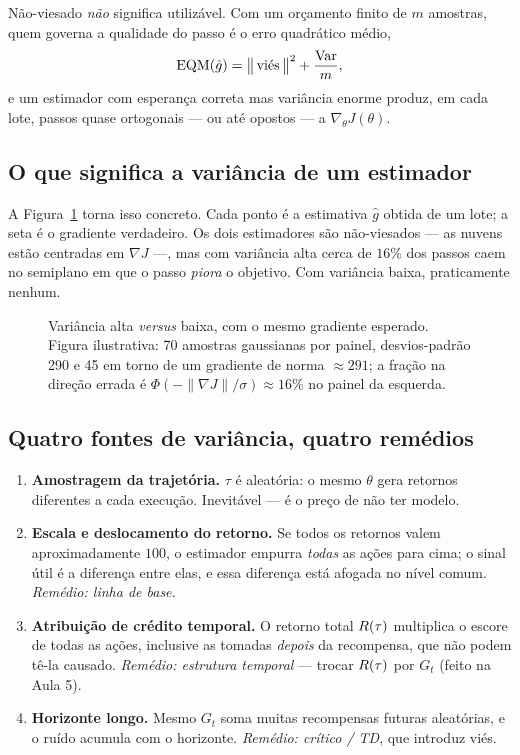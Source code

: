\documentclass[11pt, a4paper]{article}
\newcommand{\ghat}{\hat{g}}
\begin{document}
\begin{alertabox}
Não-viesado \emph{não} significa utilizável. Com um orçamento finito de $m$
amostras, quem governa a qualidade do passo é o erro quadrático médio,
\[
  \mathrm{EQM}(\ghat) = \big\|\,\text{viés}\,\big\|^2 + \frac{\Var}{m},
\]
e um estimador com esperança correta mas variância enorme produz, em cada lote,
passos quase ortogonais --- ou até opostos --- a $\nabla_\theta J(\theta)$.
\end{alertabox}

\subsection{O que significa a variância de um estimador}

A Figura~\ref{fig:variancia} torna isso concreto. Cada ponto é a estimativa
$\ghat$ obtida de um lote; a seta é o gradiente verdadeiro. Os dois
estimadores são não-viesados --- as nuvens estão centradas em $\nabla J$ ---,
mas com variância alta cerca de $16\%$ dos passos caem no semiplano em que o
passo \emph{piora} o objetivo. Com variância baixa, praticamente nenhum.

\begin{figure}[h]
  \centering
  \resizebox{\textwidth}{!}{}
  \caption{Variância alta \emph{versus} baixa, com o mesmo gradiente esperado.
  Figura ilustrativa: 70 amostras gaussianas por painel, desvios-padrão 290 e
  45 em torno de um gradiente de norma $\approx 291$; a fração na direção errada
  é $\Phi(-\|\nabla J\|/\sigma)\approx 16\%$ no painel da esquerda.}
  \label{fig:variancia}
\end{figure}

\subsection{Quatro fontes de variância, quatro remédios}

\begin{enumerate}
  \item \textbf{Amostragem da trajetória.} $\tau$ é aleatória: o mesmo $\theta$
        gera retornos diferentes a cada execução. Inevitável --- é o preço de
        não ter modelo.
  \item \textbf{Escala e deslocamento do retorno.} Se todos os retornos valem
        aproximadamente $100$, o estimador empurra \emph{todas} as ações para
        cima; o sinal útil é a diferença entre elas, e essa diferença está
        afogada no nível comum. \emph{Remédio: linha de base.}
  \item \textbf{Atribuição de crédito temporal.} O retorno total $R(\tau)$
        multiplica o escore de todas as ações, inclusive as tomadas
        \emph{depois} da recompensa, que não podem tê-la causado.
        \emph{Remédio: estrutura temporal} --- trocar $R(\tau)$ por $G_t$
        (feito na Aula 5).
  \item \textbf{Horizonte longo.} Mesmo $G_t$ soma muitas recompensas futuras
        aleatórias, e o ruído acumula com o horizonte. \emph{Remédio: crítico /
        TD}, que introduz viés.
\end{enumerate}
\end{document}
